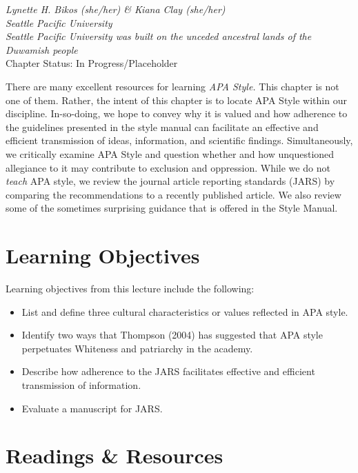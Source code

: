 \documentclass[
  11pt,
]{book}
\providecommand{\tightlist}{%
  \setlength{\itemsep}{0pt}\setlength{\parskip}{0pt}}
\begin{document}
\emph{Lynette H. Bikos (she/her) \& Kiana Clay (she/her)}\\
\emph{Seattle Pacific University}\\
\emph{Seattle Pacific University was built on the unceded ancestral lands of the Duwamish people}\\
Chapter Status: In Progress/Placeholder

There are many excellent resources for learning \emph{APA Style.} This chapter is not one of them. Rather, the intent of this chapter is to locate APA Style within our discipline. In-so-doing, we hope to convey why it is valued and how adherence to the guidelines presented in the style manual can facilitate an effective and efficient transmission of ideas, information, and scientific findings. Simultaneously, we critically examine APA Style and question whether and how unquestioned allegiance to it may contribute to exclusion and oppression. While we do not \emph{teach} APA style, we review the journal article reporting standards (JARS) by comparing the recommendations to a recently published article. We also review some of the sometimes surprising guidance that is offered in the Style Manual.

\hypertarget{learning-objectives-2}{%
\section{Learning Objectives}\label{learning-objectives-2}}

Learning objectives from this lecture include the following:

\begin{itemize}
\tightlist
\item
  List and define three cultural characteristics or values reflected in APA style.
\item
  Identify two ways that Thompson (2004) has suggested that APA style perpetuates Whiteness and patriarchy in the academy.
\item
  Describe how adherence to the JARS facilitates effective and efficient transmission of information.
\item
  Evaluate a manuscript for JARS.
\end{itemize}

\hypertarget{readings-resources}{%
\section{Readings \& Resources}\label{readings-resources}}
\end{document}
